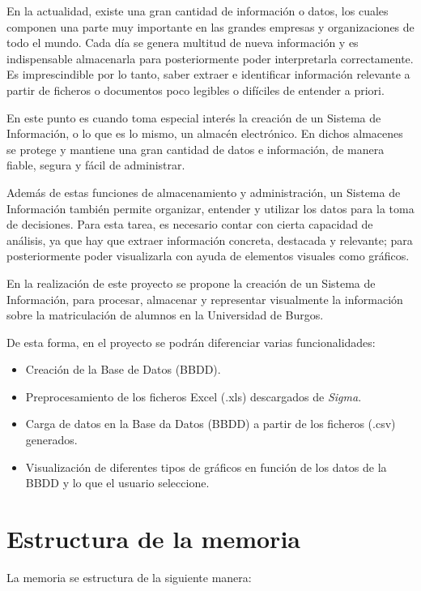 

En la actualidad, existe una gran cantidad de información o datos, los cuales componen una parte muy importante en las grandes  empresas y organizaciones de todo el mundo.
Cada día se genera multitud de nueva información y es indispensable almacenarla para posteriormente poder interpretarla correctamente. Es imprescindible por lo tanto, saber extraer e identificar información relevante a partir de ficheros o documentos poco legibles o difíciles de entender a priori.


En este punto es cuando toma especial interés la creación de un Sistema de Información, o lo que es lo mismo, un almacén electrónico. En dichos almacenes se protege y mantiene una gran cantidad de datos e información, de manera fiable, segura y fácil de administrar.

Además de estas funciones de almacenamiento y administración, un Sistema de Información también permite organizar, entender y utilizar los datos para la toma de decisiones.
Para esta tarea, es necesario contar con cierta capacidad de análisis, ya que hay que extraer información concreta, destacada y relevante; para posteriormente poder visualizarla con ayuda de elementos visuales como gráficos.

En la realización de este proyecto se propone la creación de un Sistema de Información, para procesar, almacenar y representar visualmente la información sobre la matriculación de alumnos en la Universidad de Burgos. 


De esta forma, en el proyecto se podrán diferenciar varias funcionalidades:

\begin{itemize} 
	\item Creación de la Base de Datos (BBDD).
	\item Preprocesamiento de los ficheros Excel (.xls) descargados de \emph{Sigma}.
	\item Carga de datos en la Base da Datos (BBDD) a partir de los ficheros (.csv) generados.
	\item Visualización de diferentes tipos de gráficos en función de los datos de la BBDD y lo que el usuario seleccione.
\end{itemize}


\section{Estructura de la memoria}\label{estructura-de-la-memoria}
La memoria se estructura de la siguiente manera:

